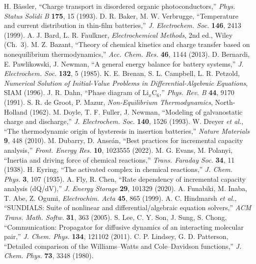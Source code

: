  H. B\"assler, ``Charge transport in disordered organic photoconductors,'' \emph{Phys. Status Solidi B} \textbf{175}, 15 (1993).
 D. R. Baker, M. W. Verbrugge, ``Temperature and current distribution in thin-film batteries,'' \emph{J. Electrochem. Soc.} \textbf{146}, 2413 (1999).
 A. J. Bard, L. R. Faulkner, \emph{Electrochemical Methods}, 2nd ed., Wiley (Ch.~3).
 M. Z. Bazant, ``Theory of chemical kinetics and charge transfer based on nonequilibrium thermodynamics,'' \emph{Acc. Chem. Res.} \textbf{46}, 1144 (2013).
 D. Bernardi, E. Pawlikowski, J. Newman, ``A general energy balance for battery systems,'' \emph{J. Electrochem. Soc.} \textbf{132}, 5 (1985).
 K. E. Brenan, S. L. Campbell, L. R. Petzold, \emph{Numerical Solution of Initial-Value Problems in Differential-Algebraic Equations}, SIAM (1996).
 J. R. Dahn, ``Phase diagram of Li$_x$C$_6$,'' \emph{Phys. Rev. B} \textbf{44}, 9170 (1991).
 S. R. de Groot, P. Mazur, \emph{Non-Equilibrium Thermodynamics}, North-Holland (1962).
 M. Doyle, T. F. Fuller, J. Newman, ``Modeling of galvanostatic charge and discharge,'' \emph{J. Electrochem. Soc.} \textbf{140}, 1526 (1993).
 W. Dreyer \emph{et al.}, ``The thermodynamic origin of hysteresis in insertion batteries,'' \emph{Nature Materials} \textbf{9}, 448 (2010).
 M. Dubarry, D. Anse\'an, ``Best practices for incremental capacity analysis,'' \emph{Front. Energy Res.} \textbf{10}, 1023555 (2022).
 M. G. Evans, M. Polanyi, ``Inertia and driving force of chemical reactions,'' \emph{Trans. Faraday Soc.} \textbf{34}, 11 (1938).
 H. Eyring, ``The activated complex in chemical reactions,'' \emph{J. Chem. Phys.} \textbf{3}, 107 (1935).
 A. Fly, R. Chen, ``Rate dependency of incremental capacity analysis (dQ/dV),'' \emph{J. Energy Storage} \textbf{29}, 101329 (2020).
 A. Funabiki, M. Inaba, T. Abe, Z. Ogumi, \emph{Electrochim. Acta} \textbf{45}, 865 (1999).
 A. C. Hindmarsh \emph{et al.}, ``SUNDIALS: Suite of nonlinear and differential/algebraic equation solvers,'' \emph{ACM Trans. Math. Softw.} \textbf{31}, 363 (2005).
 S. Lee, C. Y. Son, J. Sung, S. Chong, ``Communication: Propagator for diffusive dynamics of an interacting molecular pair,'' \emph{J. Chem. Phys.} \textbf{134}, 121102 (2011).
 C. P. Lindsey, G. D. Patterson, ``Detailed comparison of the Williams--Watts and Cole--Davidson functions,'' \emph{J. Chem. Phys.} \textbf{73}, 3348 (1980).
